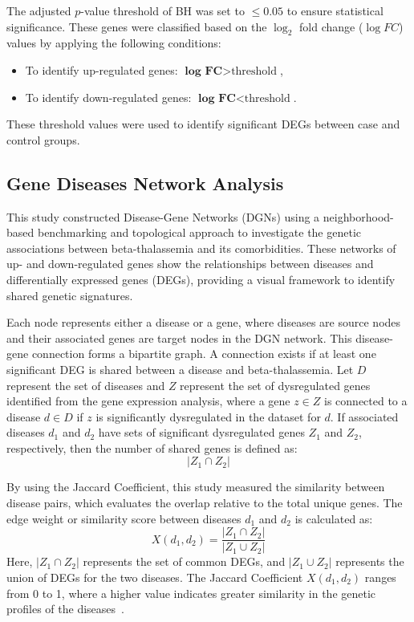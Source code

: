 The adjusted $p$-value threshold of BH was set to $\leq 0.05$ to ensure statistical significance. These genes were classified based on the $\log_2$ fold change ($\log FC$) values by applying the following conditions:
\begin{itemize}
    \item To identify up-regulated genes: $\textbf{log FC} > \text{threshold}$,
    \item To identify down-regulated genes: $\textbf{log FC} < \text{threshold}$.
\end{itemize}

These threshold values were used to identify significant DEGs between case and control groups.

\vspace*{-\parskip} %
\subsection{Gene Diseases Network Analysis}
\label{sec:sec3_4_3}

This study constructed Disease-Gene Networks (DGNs) using a neighborhood-based benchmarking and topological approach to investigate the genetic associations between beta-thalassemia and its comorbidities. These networks of up- and down-regulated genes show the relationships between diseases and differentially expressed genes (DEGs), providing a visual framework to identify shared genetic signatures.

Each node represents either a disease or a gene, where diseases are source nodes and their associated genes are target nodes in the DGN network. This disease-gene connection forms a bipartite graph. A connection exists if at least one significant DEG is shared between a disease and beta-thalassemia. Let \(D\) represent the set of diseases and \(Z\) represent the set of dysregulated genes identified from the gene expression analysis, where a gene \(z \in Z\) is connected to a disease \(d \in D\) if \(z\) is significantly dysregulated in the dataset for \(d\). If associated diseases \(d_1\) and \(d_2\) have sets of significant dysregulated genes \(Z_1\) and \(Z_2\), respectively, then the number of shared genes is defined as:
\begin{equation}
|Z_1 \cap Z_2|
\label{eq:shared_genes}
\end{equation}

By using the Jaccard Coefficient, this study measured the similarity between disease pairs, which evaluates the overlap relative to the total unique genes. The edge weight or similarity score between diseases \(d_1\) and \(d_2\) is calculated as:
\begin{equation}
X(d_1, d_2) = \frac{|Z_1 \cap Z_2|}{|Z_1 \cup Z_2|}
\label{eq:jaccard}
\end{equation}
Here, \(|Z_1 \cap Z_2|\) represents the set of common DEGs, and \(|Z_1 \cup Z_2|\) represents the union of DEGs for the two diseases. The Jaccard Coefficient \(X(d_1, d_2)\) ranges from 0 to 1, where a higher value indicates greater similarity in the genetic profiles of the diseases~\cite{jaccard_ref}.

